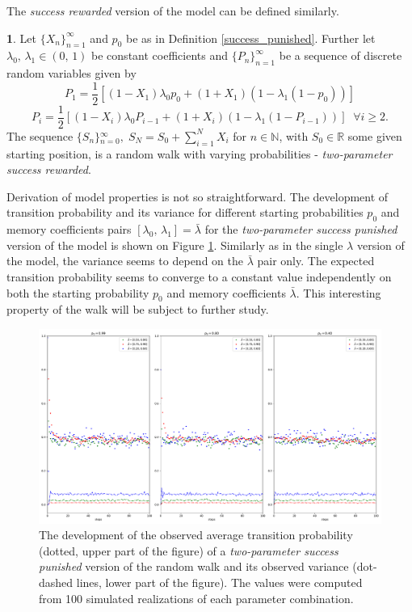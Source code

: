 \documentclass{amsart}
\theoremstyle{definition}
\newtheorem{defn}[thm]{\protect\definitionname}
\theoremstyle{plain}
\theoremstyle{plain}
\theoremstyle{plain}
\numberwithin{equation}{section}
\providecommand{\definitionname}{Definition}
\begin{document}
The \emph{success rewarded} version of the model can be defined similarly.

\begin{defn}
\label{2lambdas-reward}Let ${\{X_{n}\}}_{n=1}^{\infty}$ and $p_{0}$
be as in Definition \ref{success_punished}. Further let $\lambda_{0},\,\lambda_{1}\in(0,\,1)$
be constant coefficients and ${\{P_{n}\}}_{n=1}^{\infty}$ be a sequence
of discrete random variables given by
\[
P_{1}=\frac{1}{2}[(1-X_{1})\lambda_{0}p_{0}+(1+X_{1})(1-\lambda_{1}(1-p_{0}))]
\]
\[
P_{i}=\frac{1}{2}[(1-X_{i})\lambda_{0}P_{i-1}+(1+X_{i})(1-\lambda_{1}(1-P_{i-1}))]\;\;\forall i\geq2.
\]
The sequence ${\{S_{n}\}}{}_{n=0}^{\infty},\;S_{N}=S_{0}+\sum_{i=1}^{N}X_{i}$
for $n\in\mathbb{N}$, with $S_{0}\in\mathbb{R}$ some given starting
position, is a random walk with varying probabilities - \emph{two-parameter success
rewarded}.
\end{defn}

Derivation of model properties is not so straightforward. The development
of transition probability and its variance for different starting
probabilities $p_{0}$ and memory coefficients pairs $ [\lambda_{0},\,\lambda_{1}]=\bar{\lambda}$
for the \emph{two-parameter success punished} version of the model
is shown on Figure \ref{fig:Development-punish2l}. Similarly as in
the single $\lambda$ version of the model, the variance seems to
depend on the $\bar{\lambda}$ pair only. The expected transition
probability seems to converge to a constant value independently on
both the starting probability $p_{0}$ and memory coefficients $\bar{\lambda}$.
This interesting property of the walk will be subject to further study.

\begin{figure}
 \begin{center}
\includegraphics[width=1\textwidth]{../simulations/ept_100_walks_100_steps_type_success_punished_two_lambdas}
\caption{\label{fig:Development-punish2l}The development of the observed average
transition probability (dotted, upper part of the figure) of a \emph{two-parameter success
punished} version of the random walk and its observed
variance (dot-dashed lines, lower part of the figure). The values
were computed from 100 simulated realizations of each parameter
combination.}
 \end{center}
\end{figure}
\end{document}
